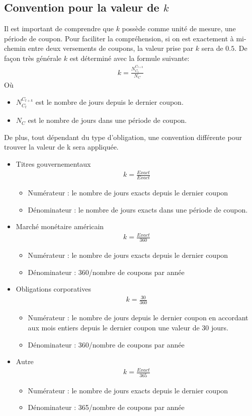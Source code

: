 \documentclass[12pt]{article}
\begin{document}
\subsection{Convention pour la valeur de $k$}
Il est important de comprendre que $k$ possède comme unité de mesure, une période de coupon. Pour faciliter la compréhension, si on est exactement à mi-chemin entre deux versements de coupons, la valeur prise par $k$ sera de $0.5$. De façon très générale $k$ est déterminé avec la formule suivante:
\begin{align*}
k= \frac{N_{C_{t}}^{C_{t+k}}}{N_C}
\end{align*}
Où 
\begin{itemize}
\item $N_{C_{t}}^{C_{t+k}}$ est le nombre de jours depuis le dernier coupon. 
\item $N_C$ est le nombre de jours dans une période de coupon. 
\end{itemize}
\newpage
De plus, tout dépendant du type d'obligation, une convention différente pour trouver la valeur de k sera appliquée.
\begin{itemize}
\item Titres gouvernementaux
\begin{align*}
k=\frac{Exact}{Exact}
\end{align*}
\begin{itemize}
\item Numérateur : le nombre de jours exacts depuis le dernier coupon
\item Dénominateur : le nombre de jours exacts dans une période de coupon.
\end{itemize}
\item Marché monétaire américain 
\begin{align*}
k=\frac{Exact}{360}
\end{align*}
\begin{itemize}
\item Numérateur : le nombre de jours exacts depuis le dernier coupon
\item Dénominateur : 360/nombre de coupons par année
\end{itemize}
\item Obligations corporatives 
\begin{align*}
k=\frac{30}{360}
\end{align*}
\begin{itemize}
\item Numérateur : le nombre de jours depuis le dernier coupon en accordant aux mois entiers depuis le dernier coupon une valeur de 30 jours.
\item Dénominateur : 360/nombre de coupons par année
\end{itemize}
\item Autre 
\begin{align*}
k=\frac{Exact}{365}
\end{align*}
\begin{itemize}
\item Numérateur : le nombre de jours exacts depuis le dernier coupon
\item Dénominateur : 365/nombre de coupons par année
\end{itemize}
\end{itemize}
\end{document}
